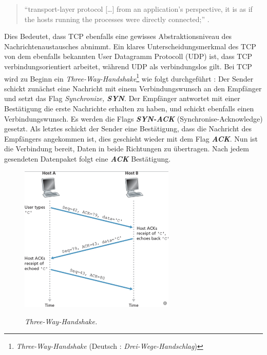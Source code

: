\documentclass[paper=a4,fontsize=12pt,ngerman]{scrartcl}
\begin{document}
\begin{quote}
``transport-layer protocol [\dots] from an application’s perspective, it is as if 
the hosts running the processes were directly connected;'' \cite[241]{kr22}.      
\end{quote}


Dies Bedeutet, dass TCP ebenfalls eine gewisses Abstraktionsniveau
des Nachrichtenaustausches abnimmt. 
\newline
Ein klares Unterscheidungsmerkmal des TCP von dem ebenfalls bekannten User Datagramm Protocoll (UDP)
ist, dass TCP verbindungsorientiert arbeitet, während UDP als verbindungslos gilt.
Bei TCP wird zu Beginn ein \textit{Three-Way-Handshake}\footnote{\textit{Three-Way-Handshake} (Deutsch : \textit{Drei-Wege-Handschlag})} 
wie folgt durchgeführt : 
\newline
Der Sender schickt zunächst eine Nachricht mit einem Verbindungswunsch an den Empfänger und setzt das Flag 
\textit{Synchronize, \textbf{SYN}}.
\newline
Der Empfänger antwortet mit einer Bestätigung die erste Nachrichte erhalten zu haben, und schickt ebenfalls einen 
Verbindungswunsch. Es werden die Flags \textit{\textbf{SYN-ACK}} (Synchronise-Acknowledge) gesetzt.
\newline
Als letztes schickt der Sender eine Bestätigung, dass die Nachricht des Empfängers angekommen ist, dies geschieht wieder
mit dem Flag \textit{\textbf{ACK}}. Nun ist die Verbindung bereit, Daten in beide Richtungen zu übertragen.
Nach jedem gesendeten Datenpaket folgt eine \textit{\textbf{ACK}} Bestätigung.

\begin{figure}[ht]
    \centering
    \includegraphics[height = 7cm]{./graphics/3way.png}
    \caption{\textit{Three-Way-Handshake.}}  \cite[296]{kr22}
\end{figure}
\end{document}
